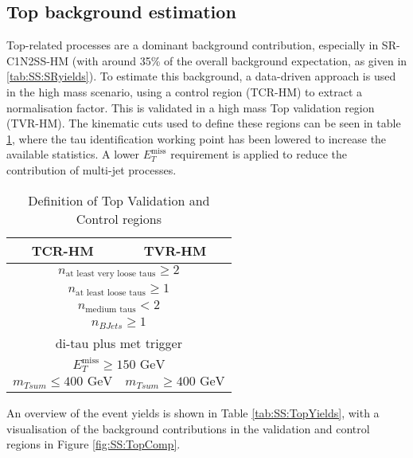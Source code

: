 \subsection{Top background estimation}
\label{sec:SS:Top}
\FloatBarrier
Top-related processes are a dominant background contribution, especially in SR-C1N2SS-HM (with around 35\% of the overall background expectation, as given in \ref{tab:SS:SRyields}). To estimate this background, a data-driven approach is used in the high mass scenario, using a control region (TCR-HM) to extract a normalisation factor. This is validated in a high mass Top validation region (TVR-HM).  The kinematic cuts used to define these regions can be seen in table \ref{tab:SS:TopVRs}, where the tau identification working point has been lowered to increase the available statistics.
A lower $E_T^\text{miss}$ requirement is applied to reduce the contribution of multi-jet processes.

\begin{table}[!htpb]
\centering
\begin{tabular}{|c|c|} \hline
TCR-HM & TVR-HM \\ \hline
\multicolumn{2}{|c|}{$n_{\text{at least very loose taus}} \geq 2$}\\
\multicolumn{2}{|c|}{$n_{\text{at least loose taus}} \geq 1$}\\
\multicolumn{2}{|c|}{$n_{\text{medium taus}} < 2$}\\
\multicolumn{2}{|c|}{$n_{BJets} \geq 1$}\\ \hline
\multicolumn{2}{|c|}{di-tau plus met trigger}\\
 \multicolumn{2}{|c|}{$E_T^\text{miss} \geq 150 \text{ GeV} $}\\
$m_{Tsum}\leq 400 \text{ GeV} $ & $m_{Tsum}\geq 400 \text{ GeV} $\\ \hline
\end{tabular}
\caption{Definition of Top Validation and Control regions \label{tab:SS:TopVRs}}
\end{table}

An overview of the event yields is shown in Table \ref{tab:SS:TopYields}, with a visualisation of the background contributions in the validation and control regions in Figure \ref{fig:SS:TopComp}.

